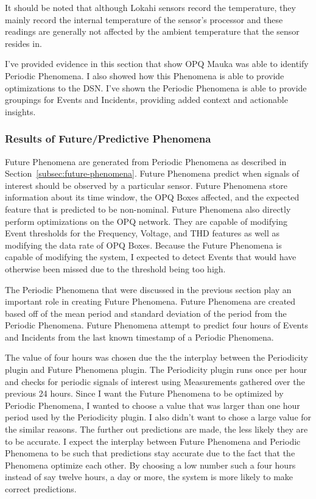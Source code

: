 It should be noted that although Lokahi sensors record the temperature, they mainly record the internal temperature of the sensor's processor and these readings are generally not affected by the ambient temperature that the sensor resides in.

I've provided evidence in this section that show OPQ Mauka was able to identify Periodic Phenomena. I also showed how this Phenomena is able to provide optimizations to the DSN. I've shown the Periodic Phenomena is able to provide groupings for Events and Incidents, providing added context and actionable insights.

\subsubsection{Results of Future/Predictive Phenomena}

Future Phenomena are generated from Periodic Phenomena as described in Section~\ref{subsec:future-phenomena}. Future Phenomena predict when signals of interest should be observed by a particular sensor. Future Phenomena store information about its time window, the OPQ Boxes affected, and the expected feature that is predicted to be non-nominal. Future Phenomena also directly perform optimizations on the OPQ network. They are capable of modifying Event thresholds for the Frequency, Voltage, and THD features as well as modifying the data rate of OPQ Boxes. Because the Future Phenomena is capable of modifying the system, I expected to detect Events that would have otherwise been missed due to the threshold being too high.

The Periodic Phenomena that were discussed in the previous section play an important role in creating Future Phenomena. Future Phenomena are created based off of the mean period and standard deviation of the period from the Periodic Phenomena. Future Phenomena attempt to predict four hours of Events and Incidents from the last known timestamp of a Periodic Phenomena.

The value of four hours was chosen due the the interplay between the Periodicity plugin and Future Phenomena plugin. The Periodicity plugin runs once per hour and checks for periodic signals of interest using Measurements gathered over the previous 24 hours. Since I want the Future Phenomena to be optimized by Periodic Phenomena, I wanted to choose a value that was larger than one hour period used by the Periodicity plugin. I also didn't want to chose a large value for the similar reasons. The further out predictions are made, the less likely they are to be accurate. I expect the interplay between Future Phenomena and Periodic Phenomena to be such that predictions stay accurate due to the fact that the Phenomena optimize each other. By choosing a low number such a four hours instead of say twelve hours, a day or more, the system is more likely to make correct predictions.

